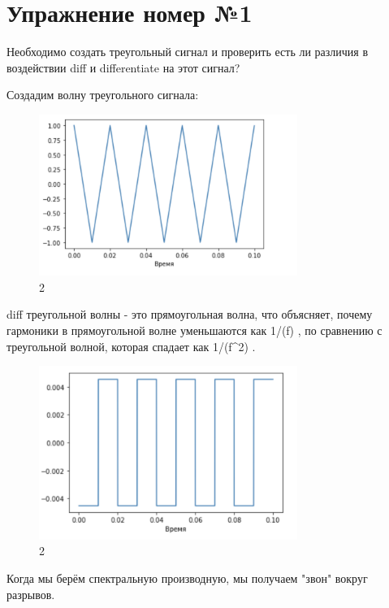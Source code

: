 \documentclass[10pt,a4paper,oneside]{article}
\begin{document}
\section{Упражнение номер №1}

Необходимо создать треугольный сигнал и проверить есть ли различия в воздействии diff и differentiate на этот сигнал? 

Создадим волну треугольного сигнала:

\begin{figure}[H]
        \centering
        \includegraphics[width=0.75\textwidth]{pics/1.png}
        \caption{2}
        \label{fig:first}
\end{figure}

diff треугольной волны - это прямоугольная волна, что объясняет, почему гармоники в прямоугольной волне уменьшаются как 1/(f) , по сравнению с треугольной волной, которая спадает как 1/(f^2) .

\begin{figure}[H]
        \centering
        \includegraphics[width=0.75\textwidth]{pics/2.png}
        \caption{2}
        \label{fig:first}
\end{figure}

Когда мы берём спектральную производную, мы получаем "звон" вокруг разрывов.
\end{document}
